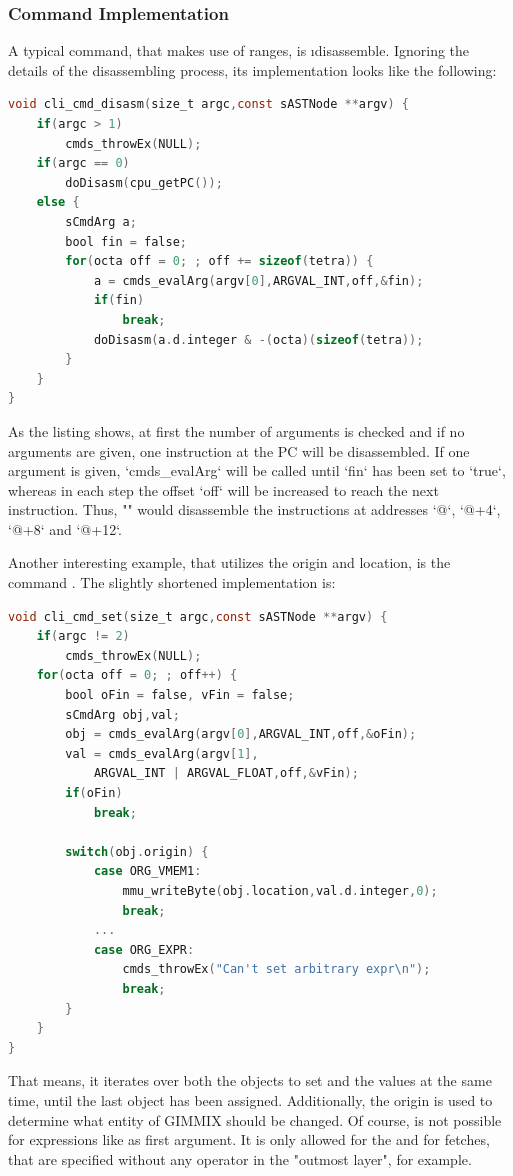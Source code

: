\subsubsection{Command Implementation}

A typical command, that makes use of ranges, is \i{disassemble}. Ignoring the details of the disassembling process, its implementation looks like the following:
\begin{lstlisting}[language=C,caption={Implementation of command \gcmd{d}}]
void cli_cmd_disasm(size_t argc,const sASTNode **argv) {
	if(argc > 1)
		cmds_throwEx(NULL);
	if(argc == 0)
		doDisasm(cpu_getPC());
	else {
		sCmdArg a;
		bool fin = false;
		for(octa off = 0; ; off += sizeof(tetra)) {
			a = cmds_evalArg(argv[0],ARGVAL_INT,off,&fin);
			if(fin)
				break;
			doDisasm(a.d.integer & -(octa)(sizeof(tetra));
		}
	}
}
\end{lstlisting}
As the listing shows, at first the number of arguments is checked and if no arguments are given, one instruction at the PC will be disassembled. If one argument is given, `cmds_evalArg` will be called until `fin` has been set to `true`, whereas in each step the offset `off` will be increased to reach the next instruction. Thus, "" would disassemble the instructions at addresses `@`, `@+4`, `@+8` and `@+12`.

Another interesting example, that utilizes the origin and location, is the command . The slightly shortened implementation is:
\begin{lstlisting}[language=C,caption={Implementation of command \gcmd{set}}]
void cli_cmd_set(size_t argc,const sASTNode **argv) {
	if(argc != 2)
		cmds_throwEx(NULL);
	for(octa off = 0; ; off++) {
		bool oFin = false, vFin = false;
		sCmdArg obj,val;
		obj = cmds_evalArg(argv[0],ARGVAL_INT,off,&oFin);
		val = cmds_evalArg(argv[1],
			ARGVAL_INT | ARGVAL_FLOAT,off,&vFin);
		if(oFin)
			break;

		switch(obj.origin) {
			case ORG_VMEM1:
				mmu_writeByte(obj.location,val.d.integer,0);
				break;
			...
			case ORG_EXPR:
				cmds_throwEx("Can't set arbitrary expr\n");
				break;
		}
	}
}
\end{lstlisting}
That means, it iterates over both the objects to set and the values at the same time, until the last object has been assigned. Additionally, the origin is used to determine what entity of GIMMIX should be changed. Of course,  is not possible for expressions like  as first argument. It is only allowed for the  and for fetches, that are specified without any operator in the "outmost layer", \ie {} for example.

